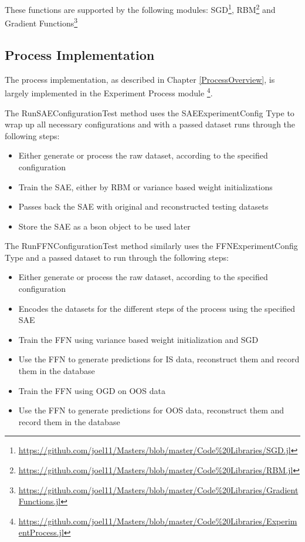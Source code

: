 \documentclass[a4paper,11pt,oneside]{article}
\theoremstyle{plain}
\theoremstyle{definition}
\begin{document}
These functions are supported by the following modules: SGD\footnote{\url{https://github.com/joel11/Masters/blob/master/Code\%20Libraries/SGD.jl}}, RBM\footnote{\url{https://github.com/joel11/Masters/blob/master/Code\%20Libraries/RBM.jl}} and Gradient Functions\footnote{\url{https://github.com/joel11/Masters/blob/master/Code\%20Libraries/GradientFunctions.jl}}

\subsection{Process Implementation}

The process implementation, as described in Chapter \ref{ProcessOverview}, is largely implemented in the Experiment Process module \footnote{\url{https://github.com/joel11/Masters/blob/master/Code\%20Libraries/ExperimentProcess.jl}}.

The RunSAEConfigurationTest method uses the SAEExperimentConfig Type to wrap up all necessary configurations and with a passed dataset runs through the following steps:
\begin{itemize}
	\item[1] Either generate or process the raw dataset, according to the specified configuration
	\item[2] Train the SAE, either by RBM or variance based weight initializations
	\item[3] Passes back the SAE with original and reconstructed testing datasets
	\item[4] Store the SAE as a bson object to be used later
\end{itemize}

The RunFFNConfigurationTest method similarly uses the FFNExperimentConfig Type and a passed dataset to run through the following steps:
\begin{itemize}
	\item[1] Either generate or process the raw dataset, according to the specified configuration
	\item[2] Encodes the datasets for the different steps of the process using the specified SAE
	\item[3] Train the FFN using variance based weight initialization and SGD
	\item[4] Use the FFN to generate predictions for IS data, reconstruct them and record them in the database
	\item[5] Train the FFN using OGD on OOS data
	\item[6] Use the FFN to generate predictions for OOS data, reconstruct them and record them in the database
\end{itemize}
\end{document}
